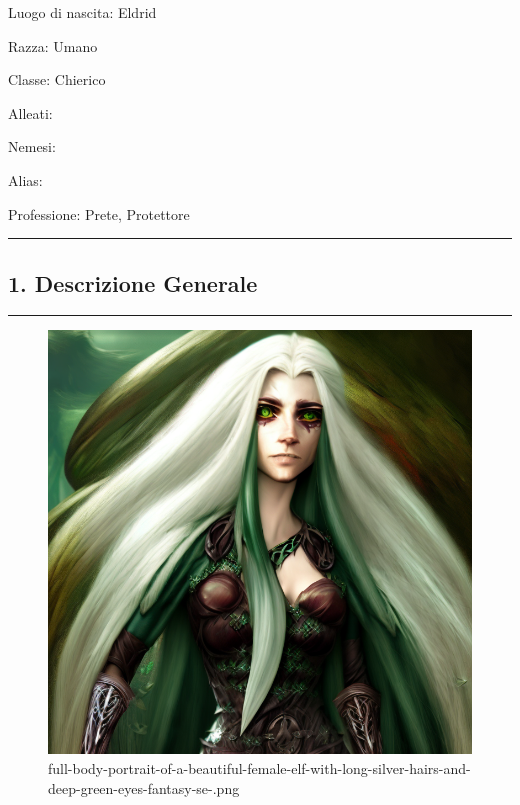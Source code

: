 Luogo di nascita: Eldrid

Razza: Umano

Classe: Chierico

Alleati:

Nemesi:

Alias:

Professione: Prete, Protettore

\begin{center}\rule{0.5\linewidth}{0.5pt}\end{center}

\subsection{1. Descrizione Generale}\label{descrizione-generale}

\begin{center}\rule{0.5\linewidth}{0.5pt}\end{center}

\begin{figure}
\centering
\includegraphics{full-body-portrait-of-a-beautiful-female-elf-with-long-silver-hairs-and-deep-green-eyes-fantasy-se-.png}
\caption{full-body-portrait-of-a-beautiful-female-elf-with-long-silver-hairs-and-deep-green-eyes-fantasy-se-.png}
\end{figure}


